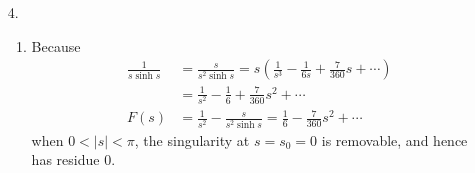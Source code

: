 \documentclass[a4paper,12pt]{article}
\begin{document}
\begin{enumerate}
    \item[4.]
        \begin{enumerate}
            \item
                Because
                \begin{align*}
                    \frac{1}{s \sinh s} &= \frac{s}{s^2 \sinh s} = s \left( \frac{1}{s^3} - \frac{1}{6s} + \frac{7}{360} s + \cdots \right) \\
                    &= \frac{1}{s^2} - \frac{1}{6} + \frac{7}{360} s^2 + \cdots \\
                    F(s) &= \frac{1}{s^2} - \frac{s}{s^2 \sinh s} = \frac{1}{6} - \frac{7}{360} s^2 + \cdots
                \end{align*}
                when $0 < |s| < \pi$, the singularity at $s = s_0 = 0$ is removable, and hence has residue $0$.


\end{enumerate}
\end{enumerate}
\end{document}
